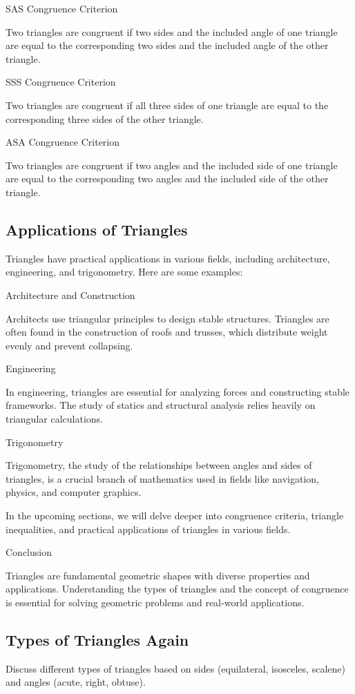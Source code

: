 \documentclass[a4paper,12pt]{book}
\newcounter{problem}
\newcounter{example}
\begin{document}
SAS Congruence Criterion

Two triangles are congruent if two sides and the included angle of one triangle are equal to the corresponding two sides and the included angle of the other triangle.

SSS Congruence Criterion

Two triangles are congruent if all three sides of one triangle are equal to the corresponding three sides of the other triangle.

ASA Congruence Criterion

Two triangles are congruent if two angles and the included side of one triangle are equal to the corresponding two angles and the included side of the other triangle.

\subsection{Applications of Triangles}

Triangles have practical applications in various fields, including architecture, engineering, and trigonometry. Here are some examples:

Architecture and Construction

Architects use triangular principles to design stable structures. Triangles are often found in the construction of roofs and trusses, which distribute weight evenly and prevent collapsing.

Engineering

In engineering, triangles are essential for analyzing forces and constructing stable frameworks. The study of statics and structural analysis relies heavily on triangular calculations.

Trigonometry

Trigonometry, the study of the relationships between angles and sides of triangles, is a crucial branch of mathematics used in fields like navigation, physics, and computer graphics.

In the upcoming sections, we will delve deeper into congruence criteria, triangle inequalities, and practical applications of triangles in various fields.

Conclusion

Triangles are fundamental geometric shapes with diverse properties and applications. Understanding the types of triangles and the concept of congruence is essential for solving geometric problems and real-world applications.


\subsection{Types of Triangles Again}
\label{subsec:types_of_triangles}
Discuss different types of triangles based on sides (equilateral, isosceles, scalene) and angles (acute, right, obtuse).
\end{document}
